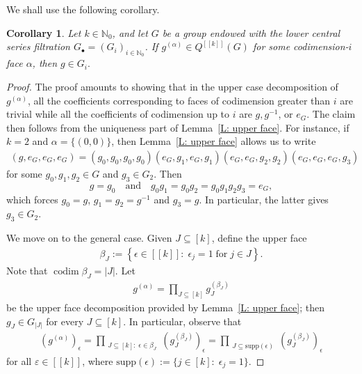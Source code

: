 \documentclass[11pt]{amsart}
\newtheorem{corollary}[lemma]{Corollary}
\theoremstyle{definition}
\newcommand{\N}{{\mathbb N}}
\newcommand{\e}{\varepsilon}%
\newcommand{\eps}{\epsilon}
\newcommand{\supp}{\textrm{supp}}
\newcommand{\cube}[1]{{[\![#1]\!]}}
\newcommand{\inv}{^{-1}}
\newcommand{\1}{{\mathbf{1}}}
\DeclareMathOperator{\codim}{codim}
\newcommand{\rem}[1]{\left \{ #1 \right \}}
\begin{document}
We shall use the following corollary.
\begin{corollary}\label{C: face}
    Let $k\in\N_0$, and let $G$ be a group endowed with the lower central series filtration $G_\bullet = (G_i)_{i\in\N_0}$. If $g^{(\alpha)}\in Q^{\cube{k}}(G)$ for some codimension-$i$ face $\alpha$, then $g\in G_i.$
\end{corollary}
\begin{proof}
The proof amounts to showing that in the upper case decomposition of $g^{(\alpha)}$, all the coefficients corresponding to faces of codimension greater than $i$ are trivial while all the coefficients of codimension up to $i$ are $g, g\inv$, or $e_G$. The claim then follows from the uniqueness part of Lemma~\ref{L: upper face}. For instance, if $k=2$ and $\alpha = \{(0,0)\}$, then
  Lemma~\ref{L: upper face} allows us to write 
\begin{align}\label{E: lower-upper face2}
    (g,e_{G},e_{G},e_{G})=(g_{0},g_{0},g_{0},g_{0})(e_{G},g_{1},e_{G},g_{1})(e_{G},e_{G},g_{2},g_{2})(e_{G},e_{G},e_{G},g_{3})
\end{align}
for some $g_{0},g_{1},g_{2}\in G$ and $g_{3}\in G_{2}$.
Then 
$$g=g_{0} \quad \textrm{and}\quad g_{0}g_{1}=g_{0}g_{2}=g_{0}g_{1}g_{2}g_{3}=e_{G},$$
which forces $g_{0}=g$, $g_{1}=g_{2}=g^{-1}$ and $g_{3}=g$. In particular, the latter gives $g_3\in G_2$. 


We move on to the general case. Given $J\subseteq[k]$, define the upper face
\begin{align*}
    \beta_J:= \rem{\eps\in\cube{k}\colon\; \eps_{j}=1\; \textrm{for}\; j\in J}.
\end{align*}
Note that $\codim \beta_J = |J|$.
Let
\begin{align*}
g^{(\alpha)}=\prod_{J\subseteq [k]}g_{J}^{(\beta_{J})}    
\end{align*}
 be the upper face decomposition provided by Lemma~\ref{L: upper face}; then $g_{J}\in G_{|J|}$ for every $J\subseteq[k]$. In particular, observe that
\begin{align}\label{E: ufd}
    (g^{(\alpha)})_\eps=\prod_{\substack{J\subseteq[k]\colon\;\eps\in \beta_J}}(g_{J}^{(\beta_{J})})_\eps = \prod_{\substack{J\subseteq\supp(\eps)}}(g_{J}^{(\beta_{J})})_\eps
\end{align}
for all $\e\in\cube{k}$,
where $\supp(\eps):=\{j\in[k]\colon\; \eps_j = 1\}$.


\end{proof}
\end{document}
